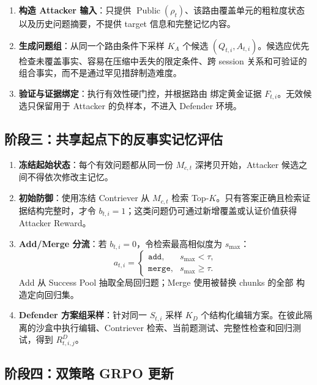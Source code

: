 \documentclass[a4paper,11pt]{article}
\begin{document}
\begin{enumerate}[resume]
    \item \textbf{构造 Attacker 输入}：只提供 $\operatorname{Public}(\rho_t)$、该路由覆盖单元的粗粒度状态以及历史问题摘要，不提供 target 信息和完整记忆内容。

    \item \textbf{生成问题组}：从同一个路由条件下采样 $K_A$ 个候选 $(Q_{t,i},A_{t,i})$。候选应优先检查未覆盖事实、容易在压缩中丢失的限定条件、跨 session 关系和可验证的组合事实，而不是通过罕见措辞制造难度。

    \item \textbf{验证与证据绑定}：执行有效性硬门控，并根据路由  绑定黄金证据 $F_{t,i}$。无效候选只保留用于 Attacker 的负样本，不进入 Defender 环境。
\end{enumerate}

\subsection*{阶段三：共享起点下的反事实记忆评估}

\begin{enumerate}[resume]
    \item \textbf{冻结起始状态}：每个有效问题都从同一份 $M_{c,t}$ 深拷贝开始，Attacker 候选之间不得依次修改主记忆。

    \item \textbf{初始防御}：使用冻结 Contriever 从 $M_{c,t}$ 检索 Top-$K$。只有答案正确且检索证据结构完整时，才令 $b_{t,i}=1$；这类问题仍可通过新增覆盖或认证价值获得 Attacker Reward。

    \item \textbf{Add/Merge 分流}：若 $b_{t,i}=0$，令检索最高相似度为 $s_{\max}$：
    \[
        a_{t,i}=
        \begin{cases}
            \texttt{add}, & s_{\max}<\tau,\\
            \texttt{merge}, & s_{\max}\ge\tau.
        \end{cases}
    \]
    Add 从 Success Pool 抽取全局回归题；Merge 使用被替换 chunks 的全部  构造定向回归集。

    \item \textbf{Defender 方案组采样}：针对同一 $S_{t,i}$ 采样 $K_D$ 个结构化编辑方案。在彼此隔离的沙盒中执行编辑、Contriever 检索、当前题测试、完整性检查和回归测试，得到 $R^D_{t,i,j}$。
\end{enumerate}

\subsection*{阶段四：双策略 GRPO 更新}
\end{document}
